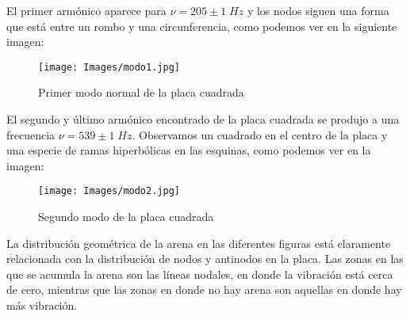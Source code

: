 \documentclass[a4paper,12pt,titlepage]{article}
\begin{document}
\par El primer armónico aparece para $\nu=205\pm1\;Hz$ y los nodos siguen una forma que está entre un rombo y una circunferencia, como podemos ver en la siguiente imagen:

\begin{figure}[h!]
    \centering
    \texttt{[image: Images/modo1.jpg]}
    \caption{Primer modo normal de la placa cuadrada}
\end{figure}

\newpage

El segundo y último armónico encontrado de la placa cuadrada se produjo a una frecuencia $\nu=539\pm1\;Hz$. Observamos un cuadrado en el centro de la placa y una especie de ramas hiperbólicas en las esquinas, como podemos ver en la imagen:

\begin{figure}[h!]
    \centering
    \texttt{[image: Images/modo2.jpg]}
    \caption{Segundo modo de la placa cuadrada}
\end{figure}

La distribución geométrica de la arena en las diferentes figuras está claramente relacionada con la distribución de nodos y antinodos en la placa. Las zonas en las que se acumula la arena son las líneas nodales, en donde la vibración está cerca de cero, mientras que las zonas en donde no hay arena son aquellas en donde hay más vibración.
\end{document}
